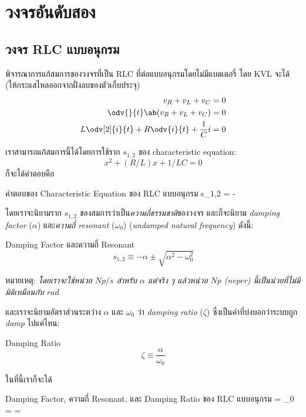 \section{วงจรอันดับสอง}

\subsection{วงจร RLC แบบอนุกรม}

พิจารณาการแก้สมการของวงจรที่เป็น RLC ที่ต่อแบบอนุกรมโดยไม่มีแบตเตอรี่ โดย KVL จะได้ (ให้กระแสไหลออกจากฝั่งลบของตัวเก็บประจุ)
\begin{align}
    v_R + v_L + v_C &= 0\notag\\
    \odv{}{t}\ab(v_R + v_L + v_C) &= 0\notag\\
    L\odv[2]{i}{t} + R\odv{i}{t} + \frac{1}{C}i &= 0\label{rlcseries}
\end{align}

เราสามารถแก้สมการนี้ได้โดยการใช้ราก $s_{1,2}$ ของ characteristic equation:
\[
x^2 + (R/L)x + 1/LC =0
\]
ก็จะได้คำตอบคือ
\begin{eqbox}{คำตอบของ Characteristic Equation ของ RLC แบบอนุกรม}
    s_{1,2} = -\pm{}
\end{eqbox}

โดยเราจะนิยามราก $s_{1,2}$ ของสมการว่าเป็น\emph{ความถี่ธรรมชาติ}ของวงจร และก็จะนิยาม \emph{damping factor} ($\alpha$) และ\emph{ความถี่ resonant} ($\omega_0$) (\emph{undamped natural frequency}) ดังนี้:
\begin{defbox}{ Damping Factor และความถี่ Resonant}
    \begin{equation}
    s_{1,2} \equiv -\alpha \pm \sqrt{\alpha^2 - \omega_0^2}
    \end{equation}
\end{defbox}
หมายเหตุ: \emph{โดยเราจะใช้หน่วย $\unit{Np/s}$ สำหรับ $\alpha$ แต่จริง ๆ แล้วหน่วย $\unit{Np}$ (neper) นี้เป็นน่วยที่ไม่มีมิติเหมือนกับ $\unit{rad}$}

และเราจะนิยามอัตราส่วนระหว่าง $\alpha$ และ $\omega_0$ ว่า \emph{damping ratio} ($\zeta$) ซึ่งเป็นค่าที่บ่งบอกว่าระบบถูก \emph{damp} ไปแค่ไหน: 
\begin{defbox}{ Damping Ratio}
    \begin{equation}
        \zeta \equiv \frac{\alpha}{\omega_0}
    \end{equation}
\end{defbox}

ในที่นี้เราก็จะได้
\begin{eqbox}{Damping Factor, ความถี่ Resonant, และ Damping Ratio ของ RLC แบบอนุกรม}
    \alpha = \qquad\omega_0 = \qquad\zeta = 
\end{eqbox}

